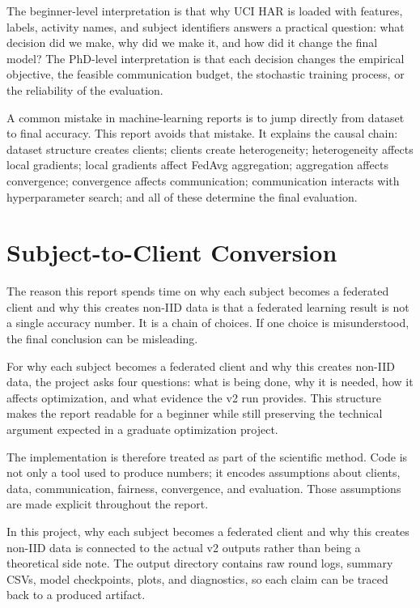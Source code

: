 \documentclass[11pt]{report}
\begin{document}
The beginner-level interpretation is that why UCI HAR is loaded with features, labels, activity
names, and subject identifiers answers a practical question: what decision did we make, why did we
make it, and how did it change the final model? The PhD-level interpretation is that each decision
changes the empirical objective, the feasible communication budget, the stochastic training process,
or the reliability of the evaluation.

A common mistake in machine-learning reports is to jump directly from dataset to final accuracy.
This report avoids that mistake. It explains the causal chain: dataset structure creates clients;
clients create heterogeneity; heterogeneity affects local gradients; local gradients affect FedAvg
aggregation; aggregation affects convergence; convergence affects communication; communication
interacts with hyperparameter search; and all of these determine the final evaluation.

\chapter{Subject-to-Client Conversion}
The reason this report spends time on why each subject becomes a federated client and why this
creates non-IID data is that a federated learning result is not a single accuracy number. It is a
chain of choices. If one choice is misunderstood, the final conclusion can be misleading.

For why each subject becomes a federated client and why this creates non-IID data, the project asks
four questions: what is being done, why it is needed, how it affects optimization, and what evidence
the v2 run provides. This structure makes the report readable for a beginner while still preserving
the technical argument expected in a graduate optimization project.

The implementation is therefore treated as part of the scientific method. Code is not only a tool
used to produce numbers; it encodes assumptions about clients, data, communication, fairness,
convergence, and evaluation. Those assumptions are made explicit throughout the report.

In this project, why each subject becomes a federated client and why this creates non-IID data is
connected to the actual v2 outputs rather than being a theoretical side note. The output directory
contains raw round logs, summary CSVs, model checkpoints, plots, and diagnostics, so each claim can
be traced back to a produced artifact.
\end{document}
